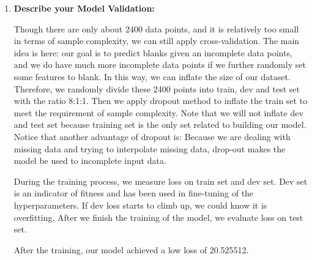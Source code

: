 \documentclass[11pt, a4paper]{article}
\begin{document}
\begin{enumerate}
	\item {\textbf{Describe your Model Validation:}}
	\par{Though there are only about 2400 data points, and it is relatively too small in terms of sample complexity, we can still apply cross-validation. The main idea is here: our goal is to predict blanks given an incomplete data points, and we do have much more incomplete data points if we further randomly set some features to blank. In this way, we can inflate the size of our dataset. Therefore, we randomly divide these 2400 points into train, dev and test set with the ratio 8:1:1. Then we apply dropout method to inflate the train set to meet the requirement of sample complexity. Note that we will not inflate dev and test set because training set is the only set related to building our model. Notice that another advantage of dropout is: Because we are dealing with missing data and trying to interpolate missing data, drop-out makes the model be used to incomplete input data.
}
	\par{During the training process, we measure loss on train set and dev set. Dev set is an indicator of fitness and has been used in fine-tuning of the hyperparameters. If dev loss starts to climb up, we could know it is overfitting. After we finish the training of the model, we evaluate loss on test set.
}
	\par{After the training, our model achieved a low loss of 20.525512.}
	

\end{enumerate}
\end{document}
